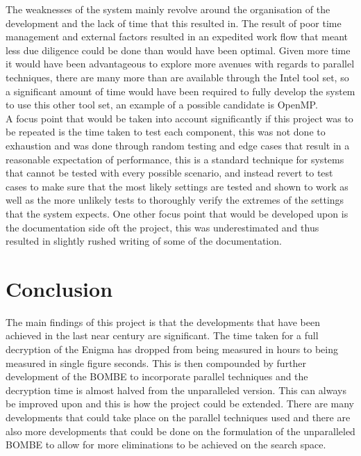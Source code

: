 \documentclass[12pt,a4paper]{article}
\begin{document}
The weaknesses of the system mainly revolve around the organisation of the development and the lack of time that this resulted in. The result of poor time management and external factors resulted in an expedited work flow that meant less due diligence could be done than would have been optimal. Given more time it would have been advantageous to explore more avenues with regards to parallel techniques, there are many more than are available through the Intel tool set, so a significant amount of time would have been required to fully develop the system to use this other tool set, an example of a possible candidate is OpenMP.\\

A focus point that would be taken into account significantly if this project was to be repeated is the time taken to test each component, this was not done to exhaustion and was done through random testing and edge cases that result in a reasonable expectation of performance, this is a standard technique for systems that cannot be tested with every possible scenario, and instead revert to test cases to make sure that the most likely settings are tested and shown to work as well as the more unlikely tests to thoroughly verify the extremes of the settings that the system expects. One other focus point that would be developed upon is the documentation side oft the project, this was underestimated and thus resulted in slightly rushed writing of some of the documentation.

\section{Conclusion}

The main findings of this project is that the developments that have been achieved in the last near century are significant. The time taken for a full decryption of the Enigma has dropped from being measured in hours to being measured in single figure seconds. This is then compounded by further development of the BOMBE to incorporate parallel techniques and the decryption time is almost halved from the unparalleled version. This can always be improved upon and this is how the project could be extended. There are many developments that could take place on the parallel techniques used and there are also more developments that could be done on the formulation of the unparalleled BOMBE to allow for more eliminations to be achieved on the search space.



\nocite{*}
\end{document}
